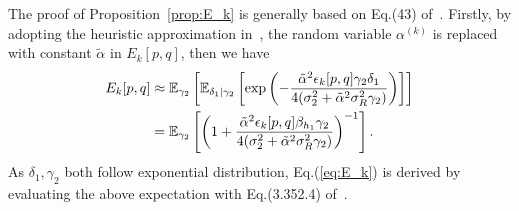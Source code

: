 \documentclass[journal]{IEEEtran}
\begin{document}
\label{sec:append}
The proof of Proposition~\ref{prop:E_k} is generally based on Eq.(43)
of~\cite{han2009performance}. Firstly, by adopting the heuristic approximation
in~\cite{jing2006distributed}, the random variable $\alpha^{(k)}$ is replaced
with constant $\tilde{\alpha}$ in $E_k[p, q]$, then we have
\begin{align}
  E_k[p, q] & \approx \mathbb{E}_{\gamma_2}
  \left[
  \mathbb{E}_{\delta_1|\gamma_2}
  \left[
  \exp\left(
  -\frac{\tilde{\alpha}^2\epsilon_k[p,q]\gamma_2 \delta_1}
  {4(\sigma_2^2+\tilde{\alpha}^2\sigma_R^2\gamma_2)}
  \right)
  \right]
  \right] \notag \\
  & = \mathbb{E}_{\gamma_2}
  \left[
  \left(1 + \frac{\tilde{\alpha}^2\epsilon_k[p,q]\beta_{h_1}\gamma_2 }
  {4(\sigma_2^2+\tilde{\alpha}^2\sigma_R^2\gamma_2)}\right)^{-1}
  \right].
\end{align}
As $\delta_1,\gamma_2$ both follow exponential distribution,
Eq.(\ref{eq:E_k}) is derived by evaluating the above expectation with Eq.(3.352.4)
of~\cite{zwillinger2014table}.

%


\end{document}
